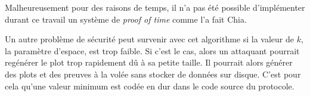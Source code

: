 Malheureusement pour des raisons de temps, il n'a pas été possible d'implémenter durant ce travail un système de \emph{proof of time} comme l'a fait Chia. 

Un autre problème de sécurité peut survenir avec cet algorithme si la valeur de $k$, la paramètre d'espace, est trop faible. Si c'est le cas, alors un attaquant pourrait regénérer le plot trop rapidement dû à sa petite taille. Il pourrait alors générer des plots et des preuves à la volée sans stocker de données sur disque. C'est pour cela qu'une valeur minimum est codée en dur dans le code source du protocole.